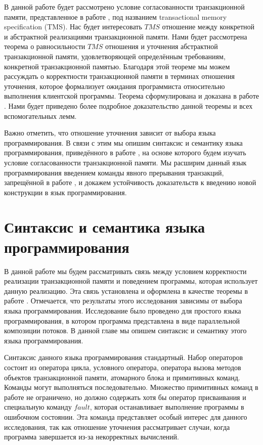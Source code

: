В данной работе будет рассмотрено условие согласованности транзакционной памяти, представленное в работе \cite{tms_article}, под названием transactional memory specification (TMS). Нас будет интересовать $TMS$ отношение между конкретной и абстрактной реализациями транзакционной памяти. Нами будет рассмотрена теорема о равносильности $TMS$ отношения и уточнения абстрактной транзакционной памяти, удовлетворяющей определённым требованиям, конкретной транзакционной памятью. Благодаря этой теореме мы можем рассуждать о корректности транзакционной памяти в терминах отношения уточнения, которое формализует ожидания программиста относительно выполнения клиентской программы. Теорема сформулирована и доказана в работе \cite{tms_article}. Нами будет приведено более подробное доказательство данной теоремы и всех вспомогательных лемм. 

Важно отметить, что отношение уточнения зависит от выбора языка программирования. В связи с этим мы опишим синтаксис и семантику языка программирования, приведённого в работе \cite{tms_article}, на основе которого будем изучать условие согласованности транзакционной памяти. Мы расширим данный язык программирования введением команды явного прерывания транзакций, запрещённой в работе \cite{tms_article}, и докажем устойчивость доказательств к введению новой конструкции в язык программирования.

\chapter{Синтаксис и семантика языка программирования}
В данной работе мы будем рассматривать связь между условием корректности реализации транзакционной памяти и поведением программы, которая использует данную реализацию. Эта связь установлена и оформлена в качестве теоремы в работе \cite{tms_article}. Отмечается, что результаты этого исследования зависимы от выбора языка программирования. Исследование \cite{tms_article} было проведено для простого языка программирования, в котором программа представлена в виде параллельной композиции потоков. В данной главе мы опишем синтаксис и семантику этого языка программирования.

Синтаксис данного языка программирования стандартный. Набор операторов состоит из оператора цикла, условного оператора, оператора вызова методов объектов транзакционной памяти, атомарного блока и примитивных команд. Команды могут выполняться последовательно. Множество примитивных команд в работе \cite{tms_article} не ограничено, но должно содержать хотя бы оператор присваивания и специальную команду $fault$, которая останавливает выполнение программы в ошибочном состоянии. Эта команда представляет особый интерес для данного исследования, так как отношение уточнения рассматривает случаи, когда программа завершается из-за некорректных вычислений.

